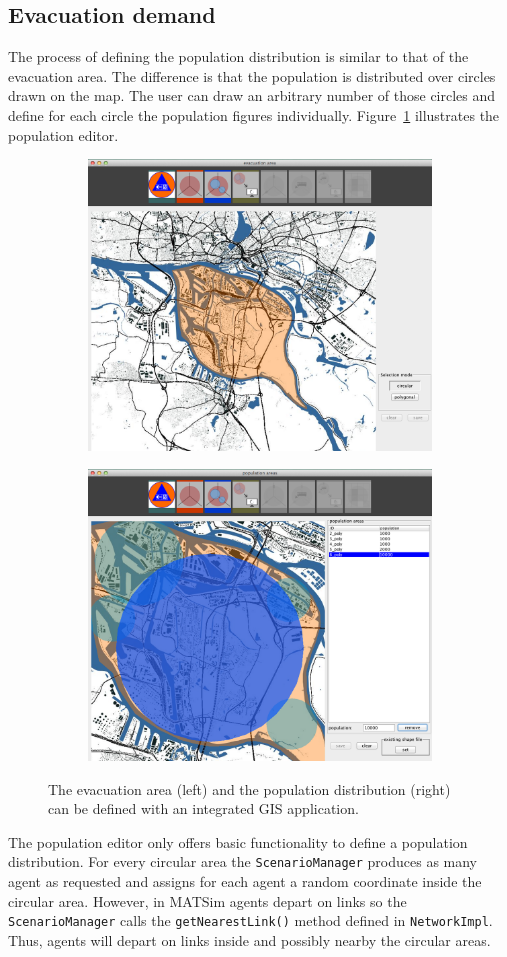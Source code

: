\subsection{Evacuation demand}
The process of defining the population distribution is similar to that of the evacuation area. 
The difference is that the population is distributed over circles drawn on the map. 
The user can draw an arbitrary number of those circles and define for each circle the population figures individually. Figure~\ref{chap:evac:fig:area_pop} illustrates the population editor. 
\begin{figure}[!ht]
\begin{subfigure}
\centering
\includegraphics[width=.475\linewidth]{extending/figures/Evacuation/evac_area_sel}
\end{subfigure}\hfill
\begin{subfigure}
\centering
\includegraphics[width=.475\linewidth]{extending/figures/Evacuation/pop_sel}
\end{subfigure}
\caption{The evacuation area (left) and the population distribution (right) can be defined with an integrated GIS application.}\label{chap:evac:fig:area_pop}
\end{figure}
The population editor only offers basic functionality to define a population distribution. For every circular area the \verb+ScenarioManager+ produces as many agent as requested and assigns for each agent a random coordinate inside the circular area. However, in MATSim agents depart on links so the \verb+ScenarioManager+ calls the \verb+getNearestLink()+ method defined in \verb+NetworkImpl+. Thus, agents will depart on links inside and possibly nearby the circular areas. 

